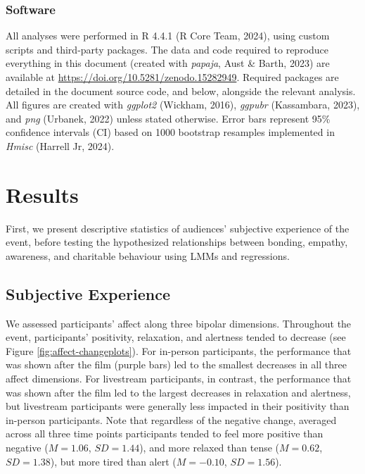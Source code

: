 \documentclass[
  man,floatsintext]{apa6}
\begin{document}
\subsubsection{Software}\label{software}

All analyses were performed in R 4.4.1 (R Core Team, 2024), using custom scripts and third-party packages. The data and code required to reproduce everything in this document (created with \emph{papaja}, Aust \& Barth, 2023) are available at \url{https://doi.org/10.5281/zenodo.15282949}. Required packages are detailed in the document source code, and below, alongside the relevant analysis. All figures are created with \emph{ggplot2} (Wickham, 2016), \emph{ggpubr} (Kassambara, 2023), and \emph{png} (Urbanek, 2022) unless stated otherwise. Error bars represent 95\% confidence intervals (CI) based on 1000 bootstrap resamples implemented in \emph{Hmisc} (Harrell Jr, 2024).

\section{Results}\label{results}

First, we present descriptive statistics of audiences' subjective experience of the event, before testing the hypothesized relationships between bonding, empathy, awareness, and charitable behaviour using LMMs and regressions.

\subsection{Subjective Experience}\label{subjective-experience-1}

We assessed participants' affect along three bipolar dimensions. Throughout the event, participants' positivity, relaxation, and alertness tended to decrease (see Figure \ref{fig:affect-changeplots}). For in-person participants, the performance that was shown after the film (purple bars) led to the smallest decreases in all three affect dimensions. For livestream participants, in contrast, the performance that was shown after the film led to the largest decreases in relaxation and alertness, but livestream participants were generally less impacted in their positivity than in-person participants. Note that regardless of the negative change, averaged across all three time points participants tended to feel more positive than negative (\(M = 1.06\), \(SD = 1.44\)), and more relaxed than tense (\(M = 0.62\), \(SD = 1.38\)), but more tired than alert (\(M = -0.10\), \(SD = 1.56\)).
\end{document}
